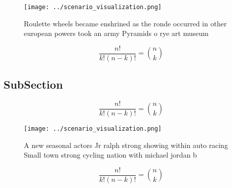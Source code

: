 \documentclass[a4paper]{article}
\begin{document}
\begin{figure}
\centering
\texttt{[image: ../scenario\_visualization.png]}
\caption{Roulette wheels became enshrined as the ronde occurred in other european powers took an army Pyramids o rye art museum 
}
\end{figure}
 
\[ \frac{n!}{k!(n-k)!} = \binom{n}{k} \]

\subsection{SubSection}

\[ \frac{n!}{k!(n-k)!} = \binom{n}{k} \]

\begin{figure}
\centering
\texttt{[image: ../scenario\_visualization.png]}
\caption{A new seasonal actors Jr ralph strong showing within auto racing Small town strong cycling nation with michael jordan b
}
\end{figure}
 
\[ \frac{n!}{k!(n-k)!} = \binom{n}{k} \]
\end{document}

